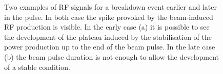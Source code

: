 \begin{figure}[h]
\centering
   \hspace{2mm}
\caption{Two examples of RF signals for a breakdown event earlier and later in the pulse. In both case the spike provoked by the beam-induced RF production is visible. In the early case (a) it is possible to see the development of the plateau induced by the stabilisation of the power production up to the end of the beam pulse. In the late case (b) the beam pulse duration is not enough to allow the development of a stable condition.}
 \label{BI_rf_fig}
 \end{figure}


